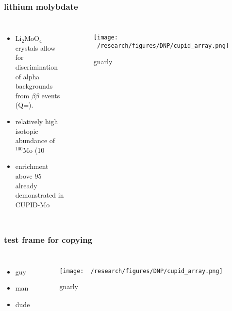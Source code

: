 \documentclass{beamer}
\begin{document}

	\begin{frame}
		\frametitle{lithium molybdate}
		\begin{columns}[c] %
			
			\begin{itemize}
				\item Li$_2$MoO$_4$ crystals allow for discrimination of alpha backgrounds from $\beta\beta$ events (Q=).
				\item relatively high isotopic abundance of $^100$Mo (10%
				\item enrichment above 95 already demonstrated in CUPID-Mo
			\end{itemize}
			
			\begin{figure}
			\texttt{[image: ~/research/figures/DNP/cupid\_array.png]}
			\caption{gnarly}
			\end{figure}
		\end{columns}
	\end{frame}

	

	\begin{frame}
		\frametitle{test frame for copying}
		\begin{columns}[c] %
			
			\begin{itemize}
				\item guy
				\item man
				\item dude
			\end{itemize}
			
			\begin{figure}
			\texttt{[image: ~/research/figures/DNP/cupid\_array.png]}
			\caption{gnarly}
			\end{figure}
			
		\end{columns}
	\end{frame}
\end{document}

